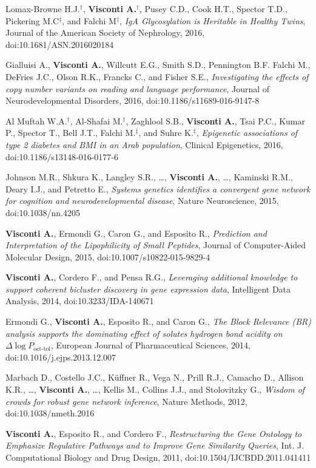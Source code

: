 \documentclass[a4paper,10pt]{article}
\begin{document}
{\begin{itemize}
		 Lomax-Browne H.J.$^{\textbf{$\dag $}}$, \textbf{Visconti A.}$^{\textbf{$\dag $}}$, Pusey C.D., Cook H.T., Spector T.D., Pickering M.C$^{\textbf{$\ddag $}}$, and Falchi M$^{\textbf{$\ddag $}}$, \emph{IgA Glycosylation is Heritable in Healthy Twins}, Journal of the American Society of Nephrology, 2016, doi:10.1681/ASN.2016020184

		 Gialluisi A., \textbf{Visconti A.}, Willcutt E.G., Smith S.D., Pennington B.F. Falchi M., DeFries J.C.,  Olson R.K., Francks C., and Fisher S.E., \emph{Investigating the effects of copy number variants on reading and language performance}, Journal of Neurodevelopmental Disorders, 2016, doi:10.1186/s11689-016-9147-8

		 Al Muftah W.A.$^{\textbf{$\dag $}}$, Al-Shafai M.$^{\textbf{$\dag $}}$, Zaghlool S.B., \textbf{Visconti A.}, Tsai P.C., Kumar P., Spector T., Bell J.T., Falchi M.$^{\textbf{$\ddag $}}$, and Suhre K.$^{\textbf{$\ddag $}}$, \emph{Epigenetic associations of type 2 diabetes and BMI in an Arab population}, Clinical Epigenetics, 2016, doi:10.1186/s13148-016-0177-6
		
		 Johnson M.R., Shkura K., Langley S.R., \dots, \textbf{Visconti A.}, \dots, Kaminski R.M., Deary I.J., and Petretto E., \emph{Systems genetics identifies a convergent gene network for cognition and neurodevelopmental disease}, Nature Neuroscience, 2015, doi:10.1038/nn.4205

		 \textbf{Visconti A.}, Ermondi G., Caron G., and Esposito R., \emph{Prediction and Interpretation of the Lipophilicity of Small Peptides}, Journal of Computer-Aided Molecular Design, 2015, doi:10.1007/s10822-015-9829-4
		
		 \textbf{Visconti A.}, Cordero F., and Pensa R.G., \emph{Leveraging additional knowledge to support coherent bicluster discovery in gene expression data}, Intelligent Data Analysis, 2014, doi:10.3233/IDA-140671
	
		 Ermondi G., \textbf{Visconti A.}, Esposito R., and Caron G., \emph{The Block Relevance (BR) analysis supports the dominating effect of solutes hydrogen bond acidity on $\Delta \log P_{\text{oct-tol}}$}, European Journal of Pharmaceutical Sciences, 2014, doi:10.1016/j.ejps.2013.12.007
		
		 Marbach D., Costello J.C., K\"{u}ffner R., Vega N., Prill R.J., Camacho D., Allison K.R., \dots, \textbf{Visconti A.}, \dots, Kellis M., Collins J.J., and Stolovitzky G., \emph{Wisdom of crowds for robust gene network inference}, Nature Methods, 2012, doi:10.1038/nmeth.2016

		 \textbf{Visconti A.}, Esposito R., and Cordero F., \emph{Restructuring the Gene Ontology to Emphasize Regulative Pathways and to Improve Gene Similarity Queries}, Int. J. Computational Biology and Drug Design, 2011, doi:10.1504/IJCBDD.2011.041411
		
	 	\end{itemize}
	}
\end{document}

